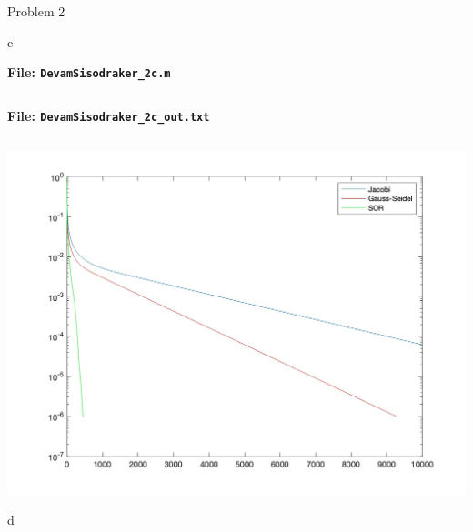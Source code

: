 \begin{section}{Problem 2}
    \newpage
    
    \begin{solution}{c}
        \begin{mdframed}
            \scriptsize
            \textbf{File: {\tt DevamSisodraker\_2c.m}}
            \inputminted{matlab}{DevamSisodraker_2c.m}
            \normalfont
        \end{mdframed}

        \continued

        \begin{mdframed}
            \footnotesize
            \textbf{File: {\tt DevamSisodraker\_2c\_out.txt}}
            \inputminted{matlab}{DevamSisodraker_2c_out.txt}
            \normalfont
        \end{mdframed}

        \continued

        \begin{mdframed}[]
            \includegraphics[scale=0.33]{DevamSisodraker_2c.jpg}
        \end{mdframed}
    \end{solution}

    \newpage
    
    \begin{solution}{d}
    \end{solution}

\end{section}